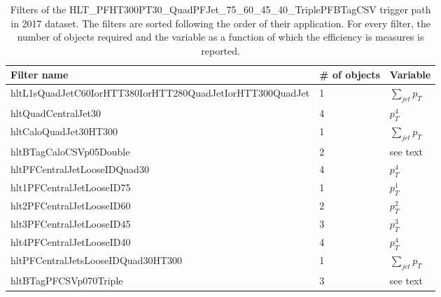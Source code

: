 \begin{table}[ht!]
\caption[Filters of the HLT\_PFHT300PT30\_QuadPFJet\_75\_60\_45\_40\_TriplePFBTagCSV trigger path in 2017 dataset]{\label{trigger:tab:filters2017}Filters of the HLT\_PFHT300PT30\_QuadPFJet\_75\_60\_45\_40\_TriplePFBTagCSV trigger path in 2017 dataset. The filters are sorted following the order of their application. For every filter, the number of objects required and the variable as a function of which the efficiency is measures is reported.}
\centering
\begin{tabularx}{\textwidth}{lXX}
    \hline
    \small Filter name &\small \# of objects    &\small Variable  \\
    \hline    
    \small hltL1sQuadJetC60IorHTT380IorHTT280QuadJetIorHTT300QuadJet &\small 1 &\small $\sum_{jet} p_T$ \\
    \small hltQuadCentralJet30 &\small 4 &\small $p_T^4$ \\ 
    \small hltCaloQuadJet30HT300 &\small 1 &\small $\sum_{jet} p_T$ \\
    \small hltBTagCaloCSVp05Double &\small 2 &\small see text \\ 
    \small hltPFCentralJetLooseIDQuad30 &\small 4 &\small $p_T^4$ \\ 
    \small hlt1PFCentralJetLooseID75 &\small 1 &\small $p_T^1$ \\ 
    \small hlt2PFCentralJetLooseID60 &\small 2 &\small $p_T^2$ \\ 
    \small hlt3PFCentralJetLooseID45 &\small 3 &\small $p_T^3$ \\ 
    \small hlt4PFCentralJetLooseID40 &\small 4 &\small $p_T^4$ \\ 
    \small hltPFCentralJetsLooseIDQuad30HT300 &\small 1 &\small $\sum_{jet} p_T$ \\
    \small hltBTagPFCSVp070Triple &\small 3 &\small see text \\ 
    \hline   
\end{tabularx}
\end{table}

\clearpage

